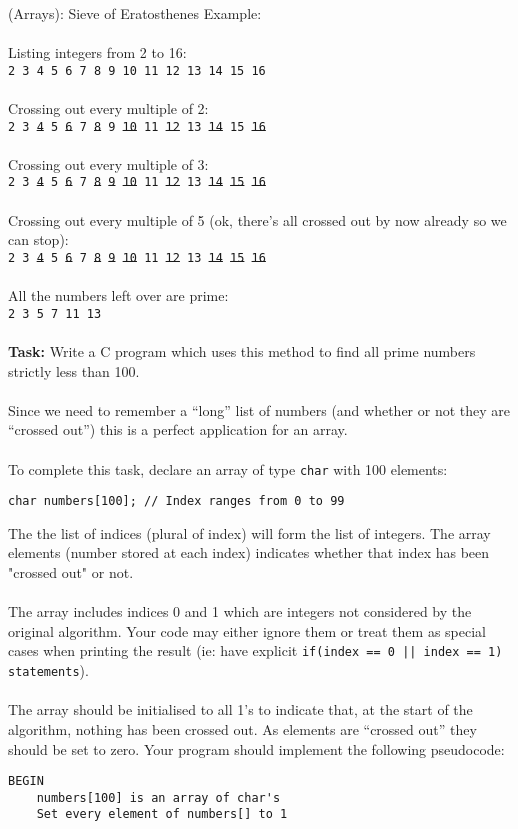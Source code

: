 \documentclass{lab}
\begin{document}
\begin{task}{(Arrays): Sieve of Eratosthenes}{}
Example:
\\~\\
Listing integers from 2 to 16:\\
\texttt{2 3 4 5 6 7 8 9 10 11 12 13 14 15 16}
\\~\\
Crossing out every multiple of 2:\\
\texttt{2 3 \st{4} 5 \st{6} 7 \st{8} 9 \st{10} 11 \st{12} 13 \st{14} 15 \st{16}}
\\~\\
Crossing out every multiple of 3:\\
\texttt{2 3 \st{4} 5 \st{6} 7 \st{8} \st{9} \st{10} 11 \st{12} 13 \st{14} \st{15} \st{16}}
\\~\\
Crossing out every multiple of 5 (ok, there's all crossed out by now already so we can stop):\\
\texttt{2 3 \st{4} 5 \st{6} 7 \st{8} \st{9} \st{10} 11 \st{12} 13 \st{14} \st{15} \st{16}}
\\~\\
All the numbers left over are prime:\\
\texttt{2 3 5 7 11 13}
\\~\\
\textbf{Task:} Write a C program which uses this method to find all prime numbers strictly less than 100.
\\~\\
Since we need to remember a ``long'' list of numbers (and whether or not they are ``crossed out'') this is a perfect application for an array.
\\~\\
To complete this task, declare an array of type \texttt{char} with 100 elements:
\begin{lstlisting}[style=Ctable]
char numbers[100]; // Index ranges from 0 to 99
\end{lstlisting}
The the list of indices (plural of index) will form the list of integers. The array elements (number stored at each index) indicates whether that index has been "crossed out" or not.
\\~\\
The array includes indices 0 and 1 which are integers not considered by the original algorithm. Your code may either ignore them or treat them as special cases when printing the result (ie: have explicit \texttt{if(index == 0 || index == 1) statements}).
\\~\\
The array should be initialised to all 1's to indicate that, at the start of the algorithm, nothing has been crossed out. As elements are ``crossed out'' they should be set to zero.
\pagebreak
Your program should implement the following pseudocode:
\begin{lstlisting}[style=pseudo]
BEGIN
	numbers[100] is an array of char's
	Set every element of numbers[] to 1
	

\end{lstlisting}
\end{task}
\end{document}
